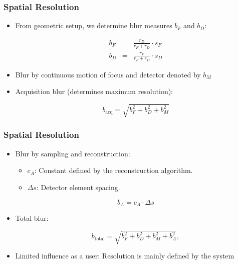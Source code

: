 \begin{frame}
	\frametitle{Spatial Resolution}

	\begin{itemize}
		\setlength\itemsep{0.3cm}
		\item From geometric setup, we determine blur measures $b_F$ and $b_D$:

		      \begin{eqnarray}
			      b_F &=& \frac{r_D}{r_F+r_D}\cdot s_F\\
			      b_D &=& \frac{r_F}{r_F+r_D}\cdot s_D
		      \end{eqnarray}

		\item Blur by continuous motion of focus and detector denoted by $b_M$
		\item Acquisition blur (determines maximum resolution):

		      \begin{equation}
			      b_{\textrm{acq}} = \sqrt{b_F^2+b_D^2+b_M^2}
		      \end{equation}

	\end{itemize}

\end{frame}

\begin{frame}
	\frametitle{Spatial Resolution}

	\begin{itemize}
		\setlength\itemsep{0.3cm}
		\item Blur by sampling and reconstruction:.
		\begin{itemize}
			\item $c_A$: Constant defined by the reconstruction algorithm.
			\item $\Delta s$: Detector element spacing.
		\end{itemize}
		      \begin{equation}
			      b_A = c_A \cdot \Delta s
		      \end{equation}


		\item Total blur:

		      \begin{equation}
			      b_{\textrm{total}} = \sqrt{b_F^2+b_D^2+b_M^2+b_A^2},
		      \end{equation}

		\item Limited influence as a user: Resolution is mainly defined by the system

	\end{itemize}

\end{frame}

